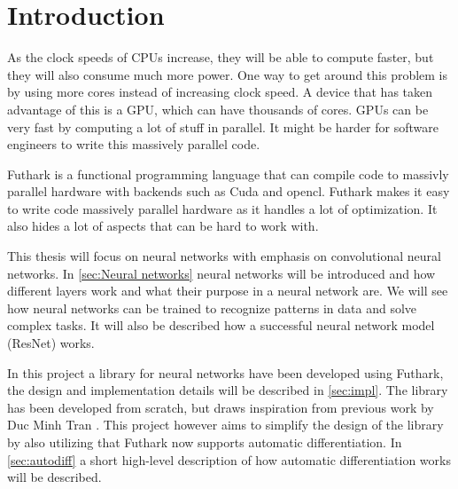 \section{Introduction}
As the clock speeds of CPUs increase, they will be able to compute faster, but they will also consume much more power.
One way to get around this problem is by using more cores instead of increasing clock speed.
A device that has taken advantage of this is a GPU, which can have thousands of cores.
GPUs can be very fast by computing a lot of stuff in parallel.
It might be harder for software engineers to write this massively parallel code.

Futhark is a functional programming language that can compile code to massivly parallel hardware with backends such as Cuda and opencl.
Futhark makes it easy to write code massively parallel hardware as it handles a lot of optimization.
It also hides a lot of aspects that can be hard to work with.

This thesis will focus on neural networks with emphasis on convolutional neural networks.
In \autoref{sec:Neural networks} neural networks will be introduced and how different layers work and what their purpose in a neural network are.
We will see how neural networks can be trained to recognize patterns in data and solve complex tasks.
It will also be described how a successful neural network model (ResNet) works.

In this project a library for neural networks have been developed using Futhark, the design and implementation details will be described in \autoref{sec:impl}.
The library has been developed from scratch, but draws inspiration from previous work by Duc Minh Tran \cite{duc}.
This project however aims to simplify the design of the library by also utilizing that Futhark now supports automatic differentiation.
In \autoref{sec:autodiff} a short high-level description of how automatic differentiation works will be described.
